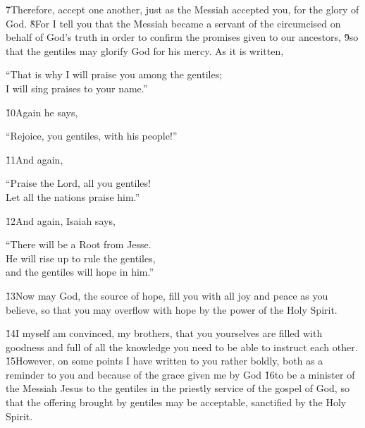 \v{7}Therefore, accept one another, just as the Messiah accepted you, for the glory of God. \v{8}For I tell you that the Messiah became a servant of the circumcised on behalf of God's truth in order to confirm the promises given to our ancestors, \v{9}so that the gentiles may glorify God for his mercy. As it is written,

\begin{poetry}
\poeml ``That is why I will praise you among the gentiles; \\
\poemll    I will sing praises to your name.''
\end{poetry}

\v{10}Again he says,

\begin{poetry}
\poeml ``Rejoice, you gentiles, with his people!''
\end{poetry}

\v{11}And again,

\begin{poetry}
\poeml ``Praise the Lord, all you gentiles! \\
\poemll    Let all the nations praise him.''
\end{poetry}

\v{12}And again, Isaiah says,

\begin{poetry}
\poeml ``There will be a Root from Jesse. \\
\poemll    He will rise up to rule the gentiles, \\
\poemlll       and the gentiles will hope in him.''
\end{poetry}

\v{13}Now may God, the source of hope, fill you with all joy and peace as you believe, so that you may overflow with hope by the power of the Holy Spirit.

\v{14}I myself am convinced, my brothers, that you yourselves are filled with goodness and full of all the knowledge you need to be able to instruct each other. \v{15}However, on some points I have written to you rather boldly, both as a reminder to you and because of the grace given me by God \v{16}to be a minister of the Messiah Jesus to the gentiles in the priestly service of the gospel of God, so that the offering brought by gentiles may be acceptable, sanctified by the Holy Spirit.


